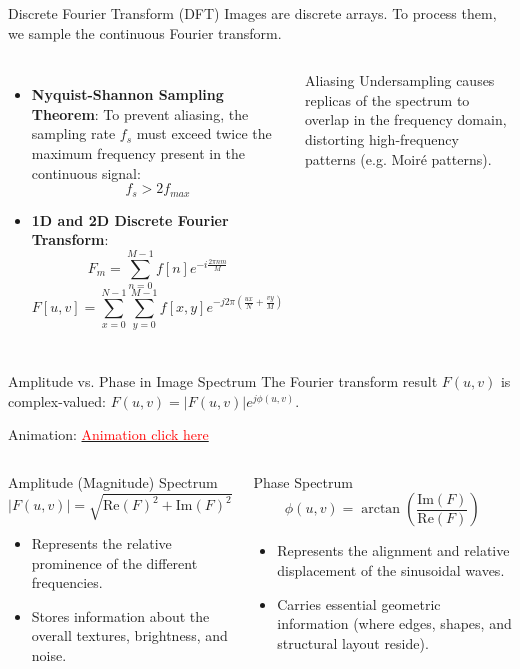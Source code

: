 \documentclass[aspectratio=169,10pt]{beamer}
\begin{document}
\begin{frame}{Discrete Fourier Transform (DFT)}
Images are discrete arrays. To process them, we sample the continuous Fourier transform.
\vspace{0.8em}
\begin{columns}[T,onlytextwidth]
\begin{itemize}
\item \textbf{Nyquist-Shannon Sampling Theorem}: To prevent aliasing, the sampling rate $f_s$ must exceed twice the maximum frequency present in the continuous signal:
\[
f_s > 2 f_{max}
\]
\item \textbf{1D and 2D Discrete Fourier Transform}:
\[
F_m = \sum_{n=0}^{M-1} f[n] e^{-i \frac{2\pi n m}{M}}
\]
\[
F[u,v] = \sum_{x=0}^{N-1} \sum_{y=0}^{M-1} f[x, y] e^{-j 2\pi \left(\frac{ux}{N} + \frac{vy}{M}\right)}
\]
\end{itemize}

\begin{block}{Aliasing}
Undersampling causes replicas of the spectrum to overlap in the frequency domain, distorting high-frequency patterns (e.g. Moir\'e patterns).
\end{block}
\end{columns}
\end{frame}

\begin{frame}{Amplitude vs. Phase in Image Spectrum}
The Fourier transform result $F(u,v)$ is complex-valued: $F(u,v) = |F(u,v)|e^{j\phi(u,v)}$.

Animation: \href{https://www.youtube.com/watch?v=MA2y_2YySq0}{\textcolor{red}{Animation click here}}
\vspace{0.8em}
\begin{columns}[T,onlytextwidth]
\begin{block}{Amplitude (Magnitude) Spectrum}
\[
|F(u,v)| = \sqrt{\text{Re}(F)^2 + \text{Im}(F)^2}
\]
\begin{itemize}
\item Represents the relative prominence of the different frequencies.
\item Stores information about the overall textures, brightness, and noise.
\end{itemize}
\end{block}

\begin{block}{Phase Spectrum}
\[
\phi(u,v) = \arctan\left( \frac{\text{Im}(F)}{\text{Re}(F)} \right)
\]
\begin{itemize}
\item Represents the alignment and relative displacement of the sinusoidal waves.
\item Carries essential geometric information (where edges, shapes, and structural layout reside).
\end{itemize}
\end{block}
\end{columns}
\end{frame}
\end{document}
